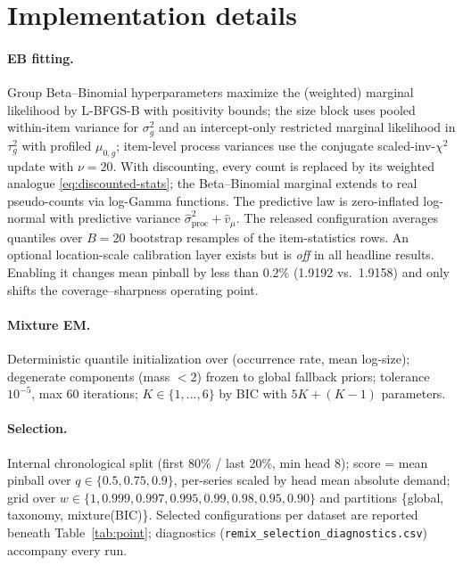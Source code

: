 \documentclass[twocolumn,10pt]{article}
\begin{document}
\section{Implementation details}\label{app:implementation}

\paragraph{EB fitting.} Group Beta--Binomial hyperparameters maximize the
(weighted) marginal likelihood by L-BFGS-B with positivity bounds; the
size block uses pooled within-item variance for $\sigma^2_g$ and an
intercept-only restricted marginal likelihood in $\tau^2_g$ with profiled
$\mu_{0,g}$; item-level process variances use the conjugate
scaled-inv-$\chi^2$ update with $\nu{=}20$. With discounting, every count
is replaced by its weighted analogue \eqref{eq:discounted-stats}; the
Beta--Binomial marginal extends to real pseudo-counts via log-Gamma
functions. The predictive law is zero-inflated log-normal with predictive
variance $\hat\sigma^2_{\mathrm{proc}}+\hat v_\mu$. The released
configuration averages quantiles over $B{=}20$ bootstrap resamples of the
item-statistics rows. An optional location-scale calibration layer exists
but is \emph{off} in all headline results. Enabling it changes mean
pinball by less than $0.2\%$ (1.9192 vs.\ 1.9158) and only shifts the
coverage--sharpness operating point.

\paragraph{Mixture EM.} Deterministic quantile initialization over
(occurrence rate, mean log-size); degenerate components (mass $<2$)
frozen to global fallback priors; tolerance $10^{-5}$, max 60 iterations;
$K\in\{1,\dots,6\}$ by BIC with $5K+(K-1)$ parameters.

\paragraph{Selection.} Internal chronological split (first 80\% / last
20\%, min head 8); score = mean pinball over $q\in\{0.5,0.75,0.9\}$,
per-series scaled by head mean absolute demand; grid over
$w\in\{1,0.999,0.997,0.995,0.99,0.98,0.95,0.90\}$ and partitions
\{global, taxonomy, mixture(BIC)\}. Selected configurations per dataset
are reported beneath Table~\ref{tab:point}; diagnostics
(\texttt{remix\_selection\_diagnostics.csv}) accompany every run.
\end{document}

